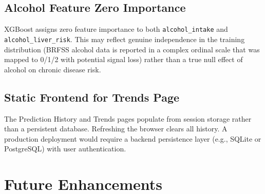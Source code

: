 \documentclass[12pt,a4paper]{report}
\begin{document}
\subsection{Alcohol Feature Zero Importance}

XGBoost assigns zero feature importance to both \texttt{alcohol\_intake} and \texttt{alcohol\_liver\_risk}. This may reflect genuine independence in the training distribution (BRFSS alcohol data is reported in a complex ordinal scale that was mapped to 0/1/2 with potential signal loss) rather than a true null effect of alcohol on chronic disease risk.

\subsection{Static Frontend for Trends Page}

The Prediction History and Trends pages populate from session storage rather than a persistent database. Refreshing the browser clears all history. A production deployment would require a backend persistence layer (e.g., SQLite or PostgreSQL) with user authentication.

\section{Future Enhancements}
\end{document}
